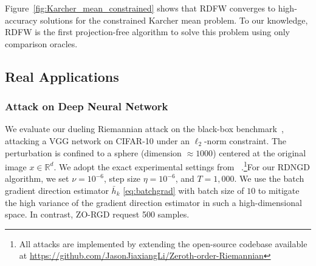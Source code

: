 \documentclass{article}
\theoremstyle{plain}
\theoremstyle{definition}
\theoremstyle{remark}
\begin{document}
Figure~\ref{fig:Karcher_mean_constrained} shows that RDFW converges to high-accuracy solutions for the constrained Karcher mean problem. To our knowledge, RDFW is the first projection-free algorithm to solve this problem using only comparison oracles.
\subsection{Real Applications}
\subsubsection{Attack on Deep Neural Network}
We evaluate our dueling Riemannian attack on the black-box benchmark~\citep{li2023stochastic}, attacking a VGG network on CIFAR-10 under an $\ell_2$-norm constraint. The perturbation is confined to a sphere (dimension $\approx 1000$) centered at the original image $x \in \mathbb{R}^d$. We adopt the exact experimental settings from ~\citep{li2023stochastic}.\footnote{All attacks are implemented by extending the open-source codebase available at \url{https://github.com/JasonJiaxiangLi/Zeroth-order-Riemannian}}For our RDNGD algorithm, we set $\nu=10^{-6}$, step size $\eta=10^{-6}$, and $T=1,000$. We use the batch gradient direction estimator $\bar{h}_k$ \eqref{eq:batchgrad} with batch size of $10$ to mitigate the high variance of the gradient direction estimator in such a high-dimensional space. In contrast, ZO-RGD request 500 samples.
\end{document}
